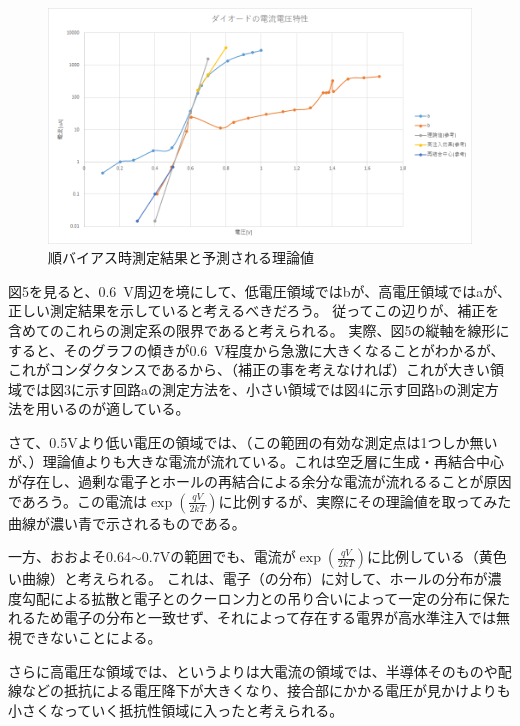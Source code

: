 \documentclass[10pt,a4j,dvipdfmx]{jsarticle}
\begin{document}
\begin{figure}[H]
  \centering
  \includegraphics[width=15cm]{Diode.png}
  \caption{順バイアス時測定結果と予測される理論値}
\end{figure}

図5を見ると、\SI{0.6}{\volt}周辺を境にして、低電圧領域ではbが、高電圧領域ではaが、正しい測定結果を示していると考えるべきだろう。
従ってこの辺りが、補正を含めてのこれらの測定系の限界であると考えられる。
実際、図5の縦軸を線形にすると、そのグラフの傾きが\SI{0.6}{\volt}程度から急激に大きくなることがわかるが、これがコンダクタンスであるから、（補正の事を考えなければ）これが大きい領域では図3に示す回路aの測定方法を、小さい領域では図4に示す回路bの測定方法を用いるのが適している。

さて、0.5Vより低い電圧の領域では、（この範囲の有効な測定点は1つしか無いが、）理論値よりも大きな電流が流れている。これは空乏層に生成・再結合中心が存在し、過剰な電子とホールの再結合による余分な電流が流れるることが原因であろう。この電流は$\exp\left(\frac{qV}{2kT}\right)$に比例するが、実際にその理論値を取ってみた曲線が濃い青で示されるものである。

一方、おおよそ0.64$\sim$0.7\si{\volt}の範囲でも、電流が$\exp\left(\frac{qV}{2kT}\right)$に比例している（黄色い曲線）と考えられる。
これは、電子（の分布）に対して、ホールの分布が濃度勾配による拡散と電子とのクーロン力との吊り合いによって一定の分布に保たれるため電子の分布と一致せず、それによって存在する電界が高水準注入では無視できないことによる。

さらに高電圧な領域では、というよりは大電流の領域では、半導体そのものや配線などの抵抗による電圧降下が大きくなり、接合部にかかる電圧が見かけよりも小さくなっていく抵抗性領域に入ったと考えられる。
\end{document}
